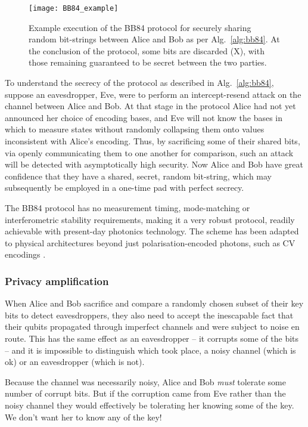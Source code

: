 \begin{figure}[htpb]
\texttt{[image: BB84\_example]}
\caption{Example execution of the BB84 protocol for securely sharing random bit-strings between Alice and Bob as per Alg.~\ref{alg:bb84}. At the conclusion of the protocol, some bits are discarded (X), with those remaining guaranteed to be secret between the two parties.} \label{fig:BB84_example}	
\end{figure}

To understand the secrecy of the protocol as described in Alg.~\ref{alg:bb84}, suppose an eavesdropper, Eve, were to perform an intercept-resend attack on the channel between Alice and Bob. At that stage in the protocol Alice had not yet announced her choice of encoding bases, and Eve will not know the bases in which to measure states without randomly collapsing them onto values inconsistent with Alice's encoding. Thus, by sacrificing some of their shared bits, via openly communicating them to one another for comparison, such an attack will be detected with asymptotically high security. Now Alice and Bob have great confidence that they have a shared, secret, random bit-string, which may subsequently be employed in a one-time pad with perfect secrecy.

The BB84 protocol has no measurement timing, mode-matching or interferometric stability requirements, making it a very robust protocol, readily achievable with present-day photonics technology. The scheme has been adapted to physical architectures beyond just polarisation-encoded photons, such as CV encodings \cite{???}.

%
%

\subsubsection{Privacy amplification}

When Alice and Bob sacrifice and compare a randomly chosen subset of their key bits to detect eavesdroppers, they also need to accept the inescapable fact that their qubits propagated through imperfect channels and were subject to noise en route. This has the same effect as an eavesdropper -- it corrupts some of the bits -- and it is impossible to distinguish which took place, a noisy channel (which is ok) or an eavesdropper (which is not).

Because the channel was necessarily noisy, Alice and Bob \textit{must} tolerate some number of corrupt bits. But if the corruption came from Eve rather than the noisy channel they would effectively be tolerating her knowing some of the key. We don't want her to know any of the key!


